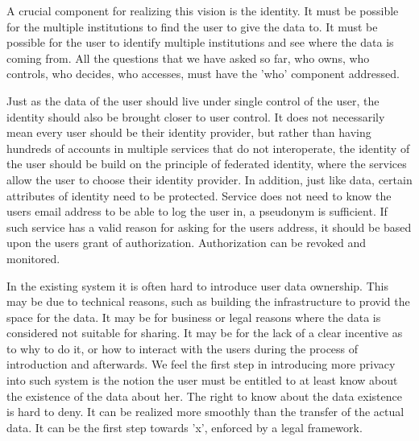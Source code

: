 A crucial component for realizing this vision is the identity.
It must be possible for the multiple institutions to find the user to give the data to. It must be possible for the user to identify multiple institutions and see where the data is coming from. 
All the questions that we have asked so far, who owns, who controls, who decides, who accesses, must have the 'who' component addressed.

Just as the data of the user should live under single control of the user, the identity should also be brought closer to user control.
It does not necessarily mean every user should be their identity provider, but rather than having hundreds of accounts in multiple services that do not interoperate, the identity of the user should be build on the principle of federated identity, where the services allow the user to choose their identity provider.
In addition, just like data, certain attributes of identity need to be protected.
Service does not need to know the users email address to be able to log the user in, a pseudonym is sufficient.
If such service has a valid reason for asking for the users address, it should be based upon the users grant of authorization.
Authorization can be revoked and monitored.

In the existing system it is often hard to introduce user data ownership. This may be due to technical reasons, such as building the infrastructure to provid the space for the data.
It may be for business or legal reasons where the data is considered not suitable for sharing.
It may be for the lack of a clear incentive as to why to do it, or how to interact with the users during the process of introduction and afterwards.
We feel the first step in introducing more privacy into such system is the notion the user must be entitled to at least know about the existence of the data about her.
The right to know about the data existence is hard to deny. It can be realized more smoothly than the transfer of the actual data. It can be the first step towards 'x', enforced by a legal framework.
